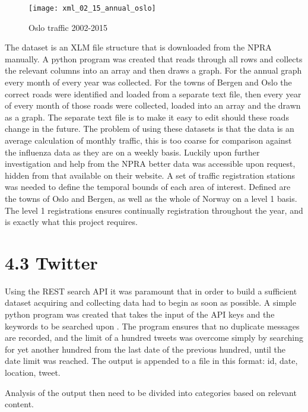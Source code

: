 \begin{figure}[ht]
\texttt{[image: xml\_02\_15\_annual\_oslo]}
\centering
\caption{Oslo traffic 2002-2015}
\label{fig:anualoslo}
\end{figure}
The dataset is an XLM file structure that is downloaded from the NPRA manually. A python program was created that reads through all rows and collects the relevant columns into an array and then draws a graph. For the annual graph every month of every year was collected. For the towns of Bergen and Oslo the correct roads were identified and loaded from a separate text file, then every year of every month of those roads were collected, loaded into an array and the drawn as a graph. The separate text file is to make it easy to edit should these roads change in the future.
The problem of using these datasets is that the data is an average calculation of monthly traffic, this is too coarse for comparison against the influenza data as they are on a weekly basis. Luckily upon further investigation and help from the NPRA better data was accessible upon request, hidden from that available on their website. A set of traffic registration stations was needed to define the temporal bounds of each area of interest. Defined are the towns of Oslo and Bergen, as well as the whole of Norway on a level 1 basis. The level 1 registrations ensures continually registration throughout the year, and is exactly what this project requires.

\newpage\newpage

\section*{4.3 Twitter}
Using the REST search API it was paramount that in order to build a sufficient dataset acquiring and collecting data had to begin as soon as possible. A simple python program was created that takes the input of the API keys and the keywords to be searched upon . The program ensures that no duplicate messages are recorded, and the limit of a hundred tweets was overcome simply by searching for yet another hundred from the last date of the previous hundred, until the date limit was reached.
The output is appended to a file in this format: id, date, location, tweet.

Analysis of the output then need to be divided into categories based on relevant content.